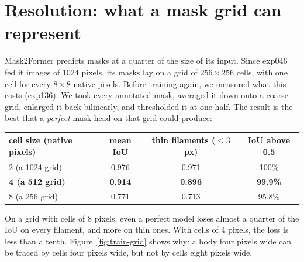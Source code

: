 \section{Resolution: what a mask grid can represent}\label{sec:train-resolution}
Mask2Former predicts masks at a quarter of the size of its input. Since exp046 fed it images of 1024
pixels, its masks lay on a grid of $256\times256$ cells, with one cell for every $8\times8$ native
pixels. Before training again, we measured what this costs (exp136). We took every annotated mask,
averaged it down onto a coarse grid, enlarged it back bilinearly, and thresholded it at one half. The
result is the best that a \emph{perfect} mask head on that grid could produce:
\begin{center}\small
\begin{tabular}{@{}lccc@{}}
\toprule
cell size (native pixels) & mean IoU & thin filaments ($\le3$ px) & IoU above 0.5 \\
\midrule
2 (a 1024 grid) & 0.976 & 0.971 & 100\% \\
\textbf{4 (a 512 grid)} & \textbf{0.914} & \textbf{0.896} & \textbf{99.9\%} \\
8 (a 256 grid) & 0.771 & 0.713 & 95.8\% \\
\bottomrule
\end{tabular}
\end{center}
On a grid with cells of 8 pixels, even a perfect model loses almost a quarter of the IoU on every
filament, and more on thin ones. With cells of 4 pixels, the loss is less than a tenth.
Figure~\ref{fig:train-grid} shows why: a body four pixels wide can be traced by cells four pixels wide,
but not by cells eight pixels wide.

